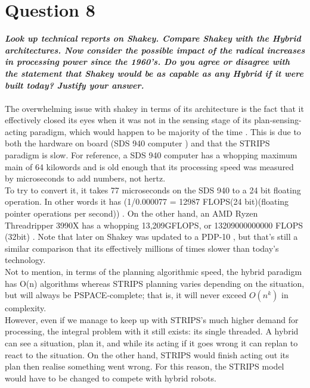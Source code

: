 \documentclass{article}
\newcommand\tab[1][1cm]{\hspace*{#1}}
\begin{document}
\section*{Question 8}
\textbf{\textit{
    \tab Look up technical reports on Shakey. Compare Shakey with the Hybrid
architectures.  Now  consider  the  possible  impact  of the  radical  increases  in
 processing power since the 1960’s. Do you agree or disagree with the statement that
Shakey would be as capable as any Hybrid if it were built today? Justify your answer.
}} \\ \\
The overwhelming issue with shakey in terms of its architecture is the fact that
it effectively closed its eyes when it was not in
the sensing stage of its plan-sensing-acting paradigm, which would happen to be majority of the time \cite{IntroToAI}. This is due 
to both the hardware on board (SDS 940 computer \cite{shakey}) and that the STRIPS paradigm is slow. For reference, a SDS 940 computer
has a whopping maximum main of 64 kilowords and is old enough that its processing speed was 
measured by microseconds to add numbers, not hertz.  \\
\tab To try to convert it, it takes 77 microseconds on the SDS 940 to a 24 bit floating operation. 
In other words it has (1/0.000077 = 12987 FLOPS(24 bit)(floating pointer operations per second)) \cite{SDS940}. 
On the other hand, an AMD Ryzen Threadripper 3990X has a whopping 13,209GFLOPS, or 13209000000000 FLOPS (32bit) \cite{threadripper}.
Note that later on Shakey was updated to a PDP-10 \cite{shakey}, but that's still a similar comparison
that its effectively millions of times slower than today's technology. 
\\
\tab Not to mention, in terms of the planning algorithmic speed, the hybrid paradigm has O(n) algorithms \cite{IntroToAI} 
whereas STRIPS planning varies depending on the situation, but will always be 
PSPACE-complete; that is, it will never exceed $O(n^k)$ in complexity. 
\\
\tab However, even if we manage to keep up with STRIPS's much higher demand for processing, the integral problem with 
it still exists: its single threaded. A hybrid can see a situation, plan it, and while its acting if it goes wrong 
it can replan to react to the situation. On the other hand, STRIPS would finish acting out its plan then realise something
went wrong. For this reason, the STRIPS model would have to be changed to compete with hybrid robots.
\newpage



\end{document}
